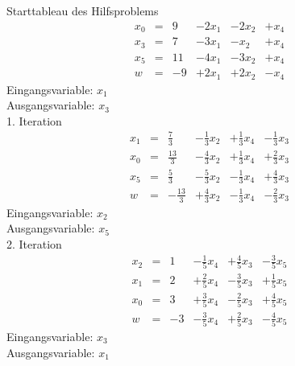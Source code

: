 \documentclass[a4paper]{scrartcl}
\begin{document}
\begin{enumerate}
\begin{enumerate}
                Starttableau des Hilfsproblems
                \begin{equation}
                    \begin{array}{rcrrrr}
                        x_0 & = & 9 & -2x_1 & -2x_2 & +x_4 \\
                        x_3 & = & 7 & -3x_1 & -x_2 & +x_4 \\
                        x_5 & = & 11 & -4x_1 & -3x_2 & +x_4 \\
                        \hline
                        w   & = & -9 & +2x_1 & +2x_2 & -x_4
                    \end{array}
                \end{equation}
                Eingangsvariable: $x_1$ \\
                Ausgangsvariable: $x_3$ \\

                1. Iteration
                \begin{equation}
                    \begin{array}{rcrrrr}
                        x_1 & = & \frac{7}{3} & -\frac{1}{3}x_2 & +\frac{1}{3}x_4 & -\frac{1}{3}x_3 \\
                        x_0 & = & \frac{13}{3} & -\frac{4}{3}x_2 & +\frac{1}{3}x_4 & +\frac{2}{3}x_3 \\
                        x_5 & = & \frac{5}{3} & -\frac{5}{3}x_2 & -\frac{1}{3}x_4 & +\frac{4}{3}x_3 \\
                        \hline
                        w   & = & -\frac{13}{3} & +\frac{4}{3}x_2 & -\frac{1}{3}x_4 & -\frac{2}{3}x_3
                    \end{array}
                \end{equation}
                Eingangsvariable: $x_2$ \\
                Ausgangsvariable: $x_5$ \\

                2. Iteration
                \begin{equation}
                    \begin{array}{rcrrrr}
                        x_2 & = & 1 & -\frac{1}{5}x_4 & +\frac{4}{5}x_3 & -\frac{3}{5}x_5 \\
                        x_1 & = & 2 & +\frac{2}{5}x_4 & -\frac{3}{5}x_3 & +\frac{1}{5}x_5 \\
                        x_0 & = & 3 & +\frac{3}{5}x_4 & -\frac{2}{5}x_3 & +\frac{4}{5}x_5 \\
                        \hline
                        w   & = & -3 & -\frac{3}{5}x_4 & +\frac{2}{5}x_3 & -\frac{4}{5}x_5
                    \end{array}
                \end{equation}
                Eingangsvariable: $x_3$ \\
                Ausgangsvariable: $x_1$ \\


\end{enumerate}
\end{enumerate}
\end{document}
